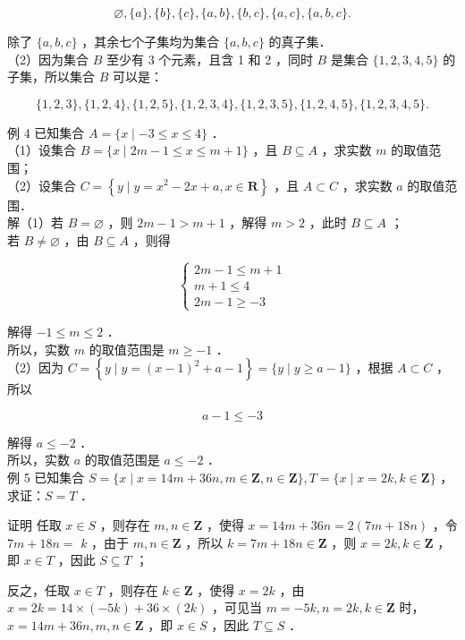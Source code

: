 \documentclass[10pt]{article}
\begin{document}
\[
\varnothing,\{a\},\{b\},\{c\},\{a, b\},\{b, c\},\{a, c\},\{a, b, c\} .
\]

除了 \(\{a, b, c\}\) ，其余七个子集均为集合 \(\{a, b, c\}\) 的真子集．\\
（2）因为集合 \(B\) 至少有 3 个元素，且含 1 和 2 ，同时 \(B\) 是集合 \(\{1,2,3,4,5\}\) 的子集，所以集合 \(B\) 可以是：

\[
\{1,2,3\},\{1,2,4\},\{1,2,5\},\{1,2,3,4\},\{1,2,3,5\},\{1,2,4,5\},\{1,2,3,4,5\} .
\]

例 4 已知集合 \(A=\{x \mid-3 \leqslant x \leqslant 4\}\) ．\\
（1）设集合 \(B=\{x \mid 2 m-1 \leqslant x \leqslant m+1\}\) ，且 \(B \subseteq A\) ，求实数 \(m\) 的取值范围；\\
（2）设集合 \(C=\left\{y \mid y=x^{2}-2 x+a, x \in \mathbf{R}\right\}\) ，且 \(A \subset C\) ，求实数 \(a\) 的取值范围．\\
解（1）若 \(B=\varnothing\) ，则 \(2 m-1>m+1\) ，解得 \(m>2\) ，此时 \(B \subseteq A\) ；\\
若 \(B \neq \varnothing\) ，由 \(B \subseteq A\) ，则得

\[
\left\{\begin{array}{l}
2 m-1 \leqslant m+1 \\
m+1 \leqslant 4 \\
2 m-1 \geqslant-3
\end{array}\right.
\]

解得 \(-1 \leqslant m \leqslant 2\) ．\\
所以，实数 \(m\) 的取值范围是 \(m \geqslant-1\) ．\\
（2）因为 \(C=\left\{y \mid y=(x-1)^{2}+a-1\right\}=\{y \mid y \geqslant a-1\}\) ，根据 \(A \subset C\) ，所以

\[
a-1 \leqslant-3
\]

解得 \(a \leqslant-2\) ．\\
所以，实数 \(a\) 的取值范围是 \(a \leqslant-2\) ．\\
例 5 已知集合 \(S=\{x \mid x=14 m+36 n, m \in \mathbf{Z}, n \in \mathbf{Z}\}, T=\{x \mid x=2 k, k \in \mathbf{Z}\}\) ，求证：\(S=T\) ．

证明 任取 \(x \in S\) ，则存在 \(m, n \in \mathbf{Z}\) ，使得 \(x=14 m+36 n=2(7 m+18 n)\) ，令 \(7 m+18 n=\) \(k\) ，由于 \(m, n \in \mathbf{Z}\) ，所以 \(k=7 m+18 n \in \mathbf{Z}\) ，则 \(x=2 k, k \in \mathbf{Z}\) ，即 \(x \in T\) ，因此 \(S \subseteq T\) ；

反之，任取 \(x \in T\) ，则存在 \(k \in \mathbf{Z}\) ，使得 \(x=2 k\) ，由 \(x=2 k=14 \times(-5 k)+36 \times(2 k)\) ，可见当 \(m=-5 k, n=2 k, k \in \mathbf{Z}\) 时，\(x=14 m+36 n, m, n \in \mathbf{Z}\) ，即 \(x \in S\) ，因此 \(T \subseteq S\) ．
\end{document}
